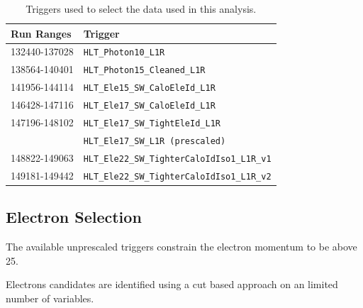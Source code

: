 \begin{table}[htb]
  \centering
  \begin{tabular}{ l l }
    Run Ranges & Trigger \\
    \midrule
    132440-137028 & \verb=HLT_Photon10_L1R= \\
    138564-140401 & \verb=HLT_Photon15_Cleaned_L1R= \\
    141956-144114 & \verb=HLT_Ele15_SW_CaloEleId_L1R= \\
    146428-147116 & \verb=HLT_Ele17_SW_CaloEleId_L1R= \\
    147196-148102 & \verb=HLT_Ele17_SW_TightEleId_L1R= \\
                  & \verb=HLT_Ele17_SW_L1R (prescaled)= \\ 
    148822-149063 & \verb=HLT_Ele22_SW_TighterCaloIdIso1_L1R_v1= \\
    149181-149442 & \verb=HLT_Ele22_SW_TighterCaloIdIso1_L1R_v2= \\
  \end{tabular}
  \caption{Triggers used to select the data used in this analysis.}
  \label{asym36:triggers}
\end{table}

\subsection{Electron Selection}

The available unprescaled triggers constrain the electron momentum to be above
\unit{25}{\GeV}.

Electrons candidates are identified using a cut based approach on an limited
number of variables.

